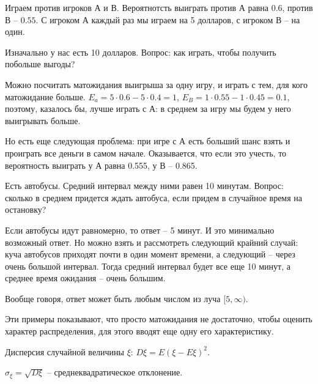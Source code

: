 \begin{exmp}

Играем против игроков А и В. Вероятнотсть выиграть против А равна $0.6$, против В -- $0.55$. 
С игроком А каждый раз мы играем на 5 долларов, с игроком В -- на один.

Изначально у нас есть 10 долларов. Вопрос: как играть, чтобы получить побольше выгоды?

Можно посчитать матожидания выигрыша за одну игру, и играть с тем, для кого матожидание больше.
$E_a = 5 \cdot 0.6 - 5 \cdot 0.4 = 1$, $E_B = 1 \cdot 0.55 - 1 \cdot 0.45 = 0.1$, поэтому, казалось бы, лучше играть с А: в среднем за игру мы будем у него выигрывать больше.

Но есть еще следующая проблема: при игре с А есть больший шанс взять и проиграть все деньги в самом 
начале. Оказывается, что если это учесть, то вероятность выиграть у А равна 0.555, у В -- 0.865.

\end{exmp}

\begin{exmp}

Есть автобусы. Средний интервал между ними равен 10 минутам. Вопрос: сколько в среднем придется ждать автобуса, если придем в случайное время на остановку?

Если автобусы идут равномерно, то ответ -- 5 минут. И это минимально возможный ответ.
Но можно взять и рассмотреть следующий крайний случай: куча автобусов приходят почти в один момент времени, а следующий -- через очень большой интервал. 
Тогда средний интервал будет все еще 10 минут, а среднее время ожидания -- очень большим.

Вообще говоря, ответ может быть любым числом из луча $[5, \infty)$.
\end{exmp}

Эти примеры показывают, что просто матожидания не достаточно, чтобы оценить характер распределения, для этого вводят еще одну его характеристику.

\begin{Def}
Дисперсия случайной величины $\xi$: $D\xi = E (\xi - E\xi)^2$.

$\sigma_\xi = \sqrt{D\xi}$ -- среднеквадратическое отклонение.
\end{Def}

